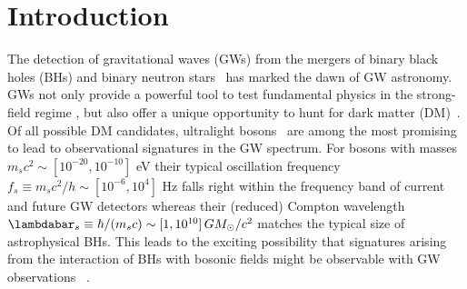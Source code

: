 \documentclass[
reprint,           %
superscriptaddress,%
amsmath,           %
amssymb,           %
aps,               %
prd,               %
notitlepage,       %
floatfix,          %
nofootinbib %
]{revtex4-1}
\begin{document}
	
\maketitle
	
	
\section{Introduction}
The detection of gravitational waves (GWs) from the mergers of binary black holes (BHs) and binary neutron stars~\cite{LIGOScientific:2018mvr,Abbott:2020niy} has marked the dawn of GW astronomy. GWs not only provide a powerful tool to test fundamental physics in the strong-field regime \cite{Barack:2018yly,Baibhav:2019rsa,LIGOScientific:2019fpa,Abbott:2020jks,Sathyaprakash:2019yqt,Barausse:2020rsu}, but also offer a unique opportunity to hunt for dark matter (DM)~\cite{Barack:2018yly,Baibhav:2019rsa,Bertone:2019irm}. 
%
Of all possible DM candidates, ultralight bosons~\cite{Preskill:1982cy,Abbott:1982af,Dine:1982ah,Arvanitaki:2009fg,Arvanitaki:2010sy,Essig:2013lka,Brito:2015oca,Marsh:2015xka,Hui:2016ltb,Annulli:2020lyc,Chadha-Day:2021szb} are among the most promising to lead to observational signatures in the GW spectrum. For bosons with masses $m_s c^2\sim [10^{-20}, 10^{-10}]$ eV their typical oscillation frequency $f_s\equiv m_s c^2/h\sim  [10^{-6}, 10^{4}]$ Hz falls right within the frequency band of current and future GW detectors whereas their (reduced) Compton wavelength $\lambdabar_s \equiv \hbar/(m_s c)\sim  [1, 10^{10}]\, G M_{\odot}/c^2$ matches the typical size of astrophysical BHs. This leads to the exciting possibility that signatures arising from the interaction of BHs with bosonic fields might be observable with GW observations~
\cite{Brito:2015oca,Barack:2018yly}. 
\end{document}
